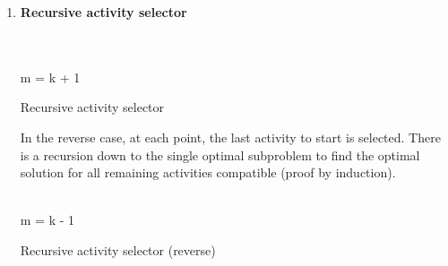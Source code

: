 \documentclass[11pt]{article}
\begin{document}
\begin{enumerate}
    \item \textbf{Recursive activity selector} \\\\
    \begin{algorithm}[H]
        \Indm{}\\
        \Indp
            m = k + 1 \\
        \caption{Recursive activity selector}
    \end{algorithm}
    In the reverse case, at each point, the last activity to start is selected. There is a recursion down to the single optimal subproblem to find the optimal solution for all remaining activities compatible (proof by induction). \\
    \begin{algorithm}[H]
        \Indm{}\\
        \Indp
            m = k - 1 \\
        \caption{Recursive activity selector (reverse)}
    \end{algorithm}
    

\end{enumerate}
\end{document}
